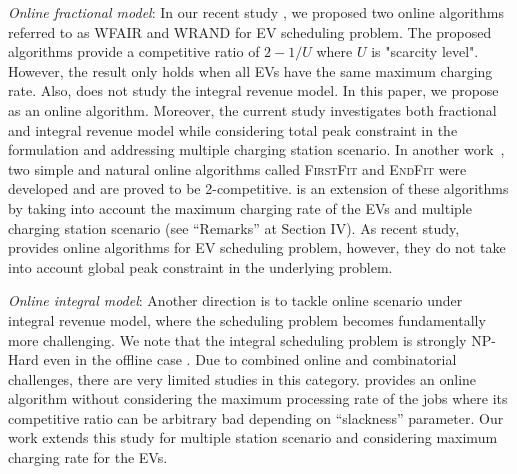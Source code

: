 \textit{Online fractional model}: In our recent study \cite{alinia2018competitive}, 
we proposed two online algorithms referred to as WFAIR and WRAND for EV scheduling problem. The proposed algorithms provide a competitive ratio of $2-1/U$ where $U$ is "scarcity level". However, the result only holds when all EVs have the same maximum charging rate. Also, \cite{alinia2018competitive} does not study the integral revenue model. In this paper, we propose \focs as an online algorithm. Moreover, the current study investigates both fractional and integral revenue model while considering total peak constraint in the formulation and addressing multiple charging station scenario. 
In another work~\cite{firstfit}, two simple and natural online algorithms called \textsc{FirstFit} and \textsc{EndFit} were developed and are proved to be 2-competitive. \focs is an extension of these algorithms by taking into account the maximum charging rate of the EVs and multiple charging station scenario (see ``Remarks'' at Section IV). As recent study, \cite{zheng2016online} provides online algorithms for EV scheduling problem, however, they do not take into account global peak constraint in the underlying problem. 

\textit{Online integral model}: Another direction is to tackle online scenario under integral revenue model, where the scheduling problem becomes fundamentally more challenging. We note that the integral scheduling problem is strongly NP-Hard even in the offline case \cite{de2018complexity}. Due to combined online and combinatorial challenges, there are very limited studies in this category. \cite{lucier2013efficient} provides an online algorithm without considering the maximum processing rate of the jobs where its competitive ratio can be arbitrary bad depending on ``slackness'' parameter. 
Our work extends this study for multiple station scenario and considering maximum charging rate for the EVs.

